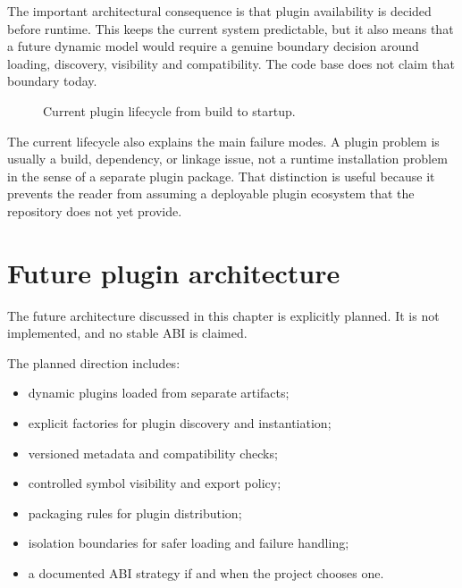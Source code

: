 The important architectural consequence is that plugin availability is
decided before runtime. This keeps the current system predictable, but it also
means that a future dynamic model would require a genuine boundary decision
around loading, discovery, visibility and compatibility. The code base does
not claim that boundary today.

\begin{figure}[htbp]
\caption{Current plugin lifecycle from build to startup.}
\label{fig:plugin-current-lifecycle}
\end{figure}

The current lifecycle also explains the main failure modes. A plugin problem is
usually a build, dependency, or linkage issue, not a runtime installation
problem in the sense of a separate plugin package. That distinction is useful
because it prevents the reader from assuming a deployable plugin ecosystem
that the repository does not yet provide.

\section{Future plugin architecture}
\label{sec:plugin-future-architecture}

The future architecture discussed in this chapter is explicitly planned. It is
not implemented, and no stable ABI is claimed.

The planned direction includes:
\begin{itemize}
 \item dynamic plugins loaded from separate artifacts;
 \item explicit factories for plugin discovery and instantiation;
 \item versioned metadata and compatibility checks;
 \item controlled symbol visibility and export policy;
 \item packaging rules for plugin distribution;
 \item isolation boundaries for safer loading and failure handling;
 \item a documented ABI strategy if and when the project chooses one.
\end{itemize}

